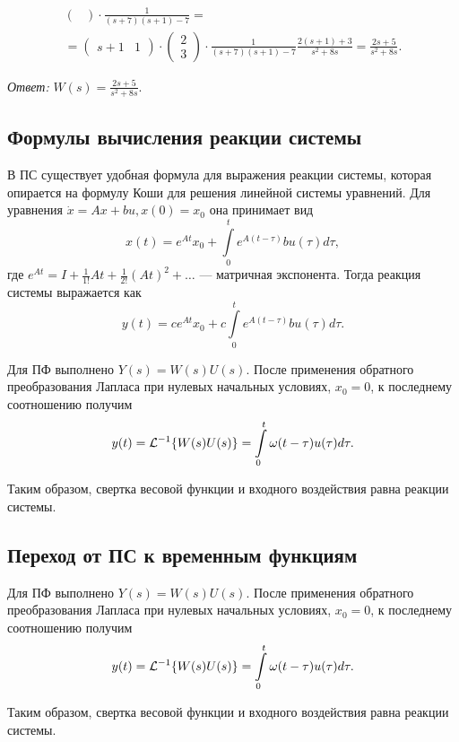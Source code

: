 \documentclass[../../TAU.tex]{subfiles}
\begin{document}
{\begin{multline*}
\begin{pmatrix}
            \end{pmatrix}
            \cdot
            \frac{1}{(s+7)(s+1)-7}
            =\\=
            \begin{pmatrix}
                s+1 & 1               
            \end{pmatrix}
            \cdot
            \begin{pmatrix}
                2 \\ 3              
            \end{pmatrix}
            \cdot
            \frac{1}{(s+7)(s+1)-7}
            \frac{2(s+1)+3}{s^2+8s}=
            \frac{2s+5}{s^2+8s}.
        \end{multline*}
            
        \textit{Ответ:} $W(s)=\frac{2s+5}{s^2+8s}.$
    }

\subsection{Формулы вычисления реакции системы}

    В ПС существует удобная формула для выражения реакции системы, которая опирается на формулу Коши для решения линейной системы уравнений. Для уравнения 
    $\dot x = Ax + bu, x(0) = x_0$ 
    она принимает вид
    $$
        x(t) = e^{At}x_0 + \int\limits_{0}^{t} e^{A(t-\tau)}bu(\tau)d\tau,
    $$
    где 
    $e^{At} = I+\frac{1}{1!}At + \frac{1}{2!}(At)^{2} + \ldots$ --- 
    матричная экспонента.
    Тогда реакция системы выражается как
    $$
        y(t) = ce^{At}x_0 + c\int\limits_{0}^{t} e^{A(t-\tau)}bu(\tau)d\tau.
    $$

    Для ПФ выполнено 
    $Y(s) = W(s)U(s)$. 
    После применения обратного преобразования Лапласа при нулевых начальных условиях, $x_0=0$, к последнему соотношению получим
    $$
        y(t) = \mathcal{L}^{-1}\{W(s)U(s)\} = \int\limits_{0}^t\omega(t-\tau)u(\tau)d\tau.
    $$

    Таким образом, свертка весовой функции и входного воздействия равна реакции системы.

\subsection{Переход от ПС к временным функциям}

    Для ПФ выполнено 
    $Y(s) = W(s)U(s)$. 
    После применения обратного преобразования Лапласа при нулевых начальных условиях, $x_0=0$, к последнему соотношению получим
    $$
        y(t) = \mathcal{L}^{-1}\{W(s)U(s)\} = \int\limits_{0}^t\omega(t-\tau)u(\tau)d\tau.
    $$

    Таким образом, свертка весовой функции и входного воздействия равна реакции системы.

\end{document}

